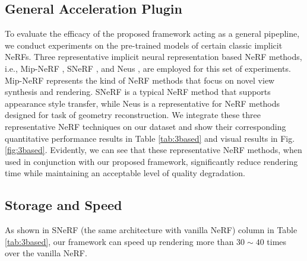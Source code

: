 \documentclass[letterpaper]{article} %
\begin{document}
\subsection{General Acceleration Plugin}
To evaluate the efficacy of the proposed framework acting as a general pipepline, we conduct experiments on the pre-trained models of certain classic implicit NeRFs. Three representative
implicit neural representation based NeRF methods, i.e., Mip-NeRF \cite{barron2021mip},
SNeRF \cite{snerf2022}, and Neus \cite{wang2021neus}, are employed for this set of experiments. 
Mip-NeRF represents the kind of NeRF methods that focus on novel view synthesis and rendering. SNeRF is a typical NeRF method that supports appearance style transfer, while Neus is a representative for NeRF methods designed for task of geometry reconstruction.
We integrate these three representative NeRF techniques on our dataset and show their corresponding quantitative performance results in Table \ref{tab:3based} and visual results in Fig. \ref{fig:3based}. Evidently, we can see that these representative NeRF methods, when used in conjunction with our proposed framework, significantly reduce rendering time while maintaining an acceptable level of quality degradation.

\subsection{Storage and Speed}
As shown in SNeRF (the same architecture with vanilla NeRF) column in Table \ref{tab:3based}, our framework can speed up rendering more than $30 \sim 40$ times over the vanilla NeRF.
\end{document}
